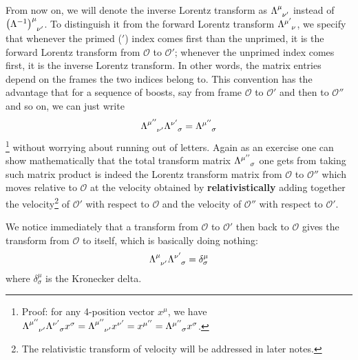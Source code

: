 \documentclass[11pt]{article}
\begin{document}
From now on, we will denote the inverse Lorentz transform as $\tensor{\Lambda}{^\mu_{\nu'}}$ instead of $\tensor{\left(\Lambda^{-1}\right)}{^\mu_{\nu'}}$. To distinguish it from the forward Lorentz transform $\tensor{\Lambda}{^{\mu'}_\nu}$, we specify that whenever the primed ($\prime$) index comes first than the unprimed, it is the forward Lorentz transform from $\mathcal{O}$ to $\mathcal{O}'$; whenever the unprimed index comes first, it is the inverse Lorentz transform. In other words, the matrix entries depend on the frames the two indices belong to. This convention has the advantage that for a sequence of boosts, say from frame $\mathcal{O}$ to $\mathcal{O}'$ and then to $\mathcal{O}''$ and so on, we can just write
\begin{equation}
    \tensor{\Lambda}{^{\mu''}_{\nu'}}\tensor{\Lambda}{^{\nu'}_\sigma}=\tensor{\Lambda}{^{\mu''}_\sigma}
\end{equation}
\footnote{Proof: for any 4-position vector $x^\mu$, we have $\tensor{\Lambda}{^{\mu''}_{\nu'}}\tensor{\Lambda}{^{\nu'}_\sigma}x^\sigma=\tensor{\Lambda}{^{\mu''}_{\nu'}}x^{\nu'}=x^{\mu''} =\tensor{\Lambda}{^{\mu''}_\sigma}x^\sigma$.}
without worrying about running out of letters. Again as an exercise one can show mathematically that the total transform matrix $\tensor{\Lambda}{^{\mu''}_\sigma}$ one gets from taking such matrix product is indeed the Lorentz transform matrix from $\mathcal{O}$ to $\mathcal{O}''$ which moves relative to $\mathcal{O}$ at the velocity obtained by \textbf{relativistically} adding together the velocity\footnote{The relativistic transform of velocity will be addressed in later notes.} of $\mathcal{O}'$ with respect to $\mathcal{O}$ and the velocity of $\mathcal{O}''$ with respect to $\mathcal{O}'$. %

We notice immediately that a transform from $\mathcal{O}$ to $\mathcal{O}'$ then back to $\mathcal{O}$ gives the transform from $\mathcal{O}$ to itself, which is basically doing nothing:
\begin{equation}
    \tensor{\Lambda}{^{\mu}_{\nu'}}\tensor{\Lambda}{^{\nu'}_\sigma}=\delta_\sigma^\mu
    \label{eq_Lorentzandback}
\end{equation}
where $\delta_\sigma^\mu$ is the Kronecker delta.
\end{document}
